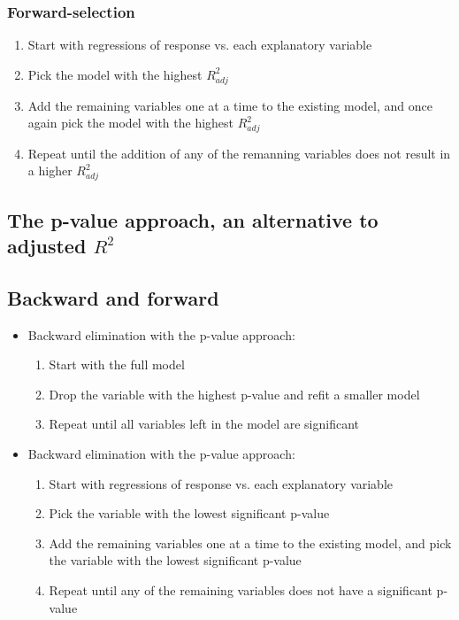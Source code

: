 
\begin{frame}
\frametitle{Forward-selection}

\begin{enumerate}

\item Start with regressions of response vs. each explanatory variable
\item Pick the model with the highest $R^2_{adj}$
\item Add the remaining variables one at a time to the existing model, and once again pick the model  with the highest $R^2_{adj}$
\item Repeat until the addition of any of the remanning variables does not result in a higher $R^2_{adj}$

\end{enumerate}

\end{frame}


\subsection{The p-value approach, an alternative to adjusted $R^2$}


\begin{frame}
\subsection{Backward and forward}

\begin{itemize}

\item Backward elimination with the p-value approach: 
\begin{enumerate}
\item Start with the full model
\item Drop the variable with the highest p-value and refit a smaller model
\item Repeat until all variables left in the model are significant
\end{enumerate}

\item Backward elimination with the p-value approach: 
\begin{enumerate}
\item Start with regressions of response vs. each explanatory variable
\item Pick the variable with the lowest significant p-value 
\item Add the remaining variables one at a time to the existing model, and pick the variable with the lowest significant p-value
\item Repeat until any of the remaining variables does not have a significant p-value
\end{enumerate}

\end{itemize}

\end{frame}

